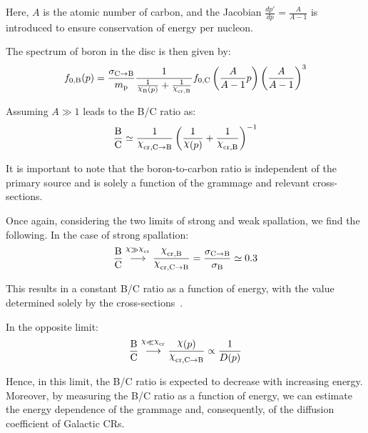Here, $A$ is the atomic number of carbon, and the Jacobian $\frac{dp'}{dp} = \frac{A}{A-1}$ is introduced to ensure conservation of energy per nucleon.

The spectrum of boron in the disc is then given by:
%
\begin{equation}
f_{0,\rm B}(p) 
= \frac{\sigma_{\rm C \rightarrow B}}{m_{\rm p}}  \frac{1}{\frac{1}{\rchi_{\rm B}(p)} + \frac{1}{\rchi_{\rm cr, B}}} f_{0, \rm C}\left(\frac{A}{A-1}p\right) \left(\frac{A}{A-1} \right)^3
\end{equation}

Assuming \( A \gg 1 \) leads to the B/C ratio as:
%
\begin{equation}
\frac{\rm B}{\rm C} \simeq \frac{1}{\rchi_{\rm cr, C\rightarrow B}} \left(\frac{1}{\rchi(p)} + \frac{1}{\rchi_{\rm cr, B}}\right)^{-1}
\label{eq:chibc}
\end{equation}

It is important to note that the boron-to-carbon ratio is independent of the primary source and is solely a function of the grammage and relevant cross-sections.

Once again, considering the two limits of strong and weak spallation, we find the following. 
%
In the case of strong spallation:
%
\begin{equation}
\frac{\rm B}{\rm C} \oset{\rchi \gg \rchi_{\rm cr}}{\, \longrightarrow \,} \frac{\rchi_{\rm cr, B}}{\rchi_{\rm cr, C\rightarrow B}} 
= \frac{\sigma_{\rm C \rightarrow B}}{\sigma_{\rm B}} 
\simeq 0.3
\end{equation}

This results in a constant B/C ratio as a function of energy, with the value determined solely by the cross-sections~\cite{Evoli2019prd}.

In the opposite limit:
%
\begin{equation}
\frac{\rm B}{\rm C} \oset{\rchi \ll \rchi_{\rm cr}}{\, \longrightarrow \,} \frac{\rchi(p)}{\rchi_{\rm cr, C\rightarrow B}} \propto \frac{1}{D(p)}
\label{eq:bchene}
\end{equation}

Hence, in this limit, the B/C ratio is expected to decrease with increasing energy. 
%
Moreover, by measuring the B/C ratio as a function of energy, we can estimate the energy dependence of the grammage and, consequently, of the diffusion coefficient of Galactic CRs.

